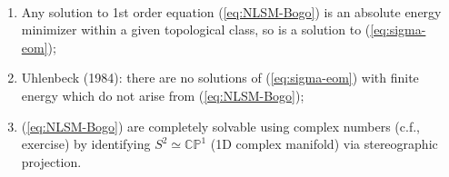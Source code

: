 \documentclass[a4paper,11pt]{article}
\begin{document}
    \begin{rmk} ~
        \begin{enumerate}[1)]
            \item Any solution to 1st order equation (\ref{eq:NLSM-Bogo}) is an absolute energy minimizer within a given topological class, so is a solution to (\ref{eq:sigma-eom});
            \item Uhlenbeck (1984): there are no solutions of (\ref{eq:sigma-eom}) with finite energy which do not arise from (\ref{eq:NLSM-Bogo});
            \item (\ref{eq:NLSM-Bogo}) are completely solvable using complex numbers (c.f., exercise) by identifying $S^2 \simeq \mathbb{CP}^1$ (1D complex manifold) via stereographic projection. 
            \begin{center}

                \begin{tikzpicture}[x=0.75pt,y=0.75pt,yscale=-1,xscale=1]


\end{tikzpicture}
\end{center}
\end{enumerate}
\end{rmk}
\end{document}

